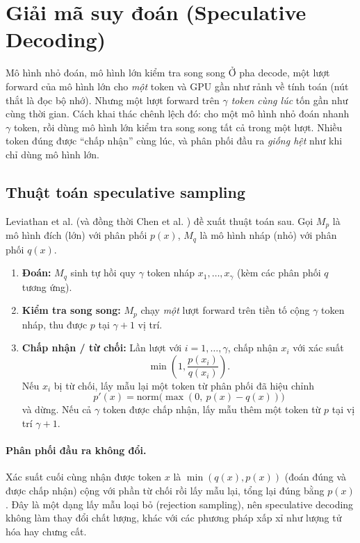 
\section{Giải mã suy đoán (Speculative Decoding)}
\label{sec:speculative_decoding}

\begin{keyidea}{Mô hình nhỏ đoán, mô hình lớn kiểm tra song song}
Ở pha decode, một lượt forward của mô hình lớn cho \emph{một} token và GPU gần như rảnh về tính toán (nút thắt là đọc bộ nhớ). Nhưng một lượt forward trên \emph{$\gamma$ token cùng lúc} tốn gần như cùng thời gian. Cách khai thác chênh lệch đó: cho một mô hình nhỏ đoán nhanh $\gamma$ token, rồi dùng mô hình lớn kiểm tra song song tất cả trong một lượt. Nhiều token đúng được “chấp nhận” cùng lúc, và phân phối đầu ra \emph{giống hệt} như khi chỉ dùng mô hình lớn.
\end{keyidea}

\subsection{Thuật toán speculative sampling}
\label{ssec:speculative_sampling}
Leviathan et al. \cite{leviathan2023speculative} (và đồng thời Chen et al. \cite{chen2023accelerating}) đề xuất thuật toán sau. Gọi $M_p$ là mô hình đích (lớn) với phân phối $p(x)$, $M_q$ là mô hình nháp (nhỏ) với phân phối $q(x)$.
\begin{enumerate}
	\item \textbf{Đoán:} $M_q$ sinh tự hồi quy $\gamma$ token nháp $x_1, \dots, x_\gamma$ (kèm các phân phối $q$ tương ứng).
	\item \textbf{Kiểm tra song song:} $M_p$ chạy \emph{một} lượt forward trên tiền tố cộng $\gamma$ token nháp, thu được $p$ tại $\gamma+1$ vị trí.
	\item \textbf{Chấp nhận / từ chối:} Lần lượt với $i = 1, \dots, \gamma$, chấp nhận $x_i$ với xác suất
	\[
	\min\left(1, \frac{p(x_i)}{q(x_i)}\right).
	\]
	Nếu $x_i$ bị từ chối, lấy mẫu lại một token từ phân phối đã hiệu chỉnh
	\[
	p'(x) = \text{norm}\big(\max(0,\ p(x) - q(x))\big)
	\]
	và dừng. Nếu cả $\gamma$ token được chấp nhận, lấy mẫu thêm một token từ $p$ tại vị trí $\gamma + 1$.
\end{enumerate}

\paragraph{Phân phối đầu ra không đổi.} Xác suất cuối cùng nhận được token $x$ là $\min(q(x), p(x))$ (đoán đúng và được chấp nhận) cộng với phần từ chối rồi lấy mẫu lại, tổng lại đúng bằng $p(x)$. Đây là một dạng lấy mẫu loại bỏ (rejection sampling), nên speculative decoding không làm thay đổi chất lượng, khác với các phương pháp xấp xỉ như lượng tử hóa hay chưng cất.

